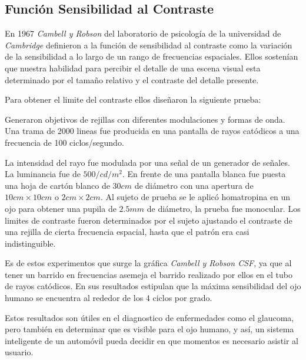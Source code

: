 \documentclass[conference]{IEEEtran}
\begin{document}
\subsection{Función Sensibilidad al Contraste}

En 1967 \textit{Cambell y Robson} del laboratorio de psicología  de la universidad de \textit{Cambridge}\cite{p5} definieron a la función de sensibilidad al contraste como la variación de la sensibilidad a lo largo de un rango de frecuencias espaciales. Ellos sostenían que nuestra habilidad para percibir el detalle de una escena visual esta determinado por el tamaño relativo y el contraste del detalle presente.

Para obtener el limite del contraste ellos diseñaron la siguiente prueba: 

Generaron objetivos de rejillas con diferentes modulaciones y formas de onda. Una  trama de 2000 lineas
fue producida en una pantalla de rayos catódicos a una frecuencia de 100 ciclos/segundo.

La intensidad del rayo fue modulada por una señal de un generador de señales. La luminancia fue de
$500/cd/m^2$. En 
frente de una pantalla blanca fue puesta una hoja de cartón blanco de $30cm$ de diámetro con una apertura de $10cm \times 10cm$ o $2cm \times 2cm$. Al sujeto de prueba se le aplicó homatropina en un ojo para obtener una pupila de $2.5 mm$ de diámetro, la prueba fue monocular. Los limites de contraste fueron determinados por el sujeto ajustando el contraste de una rejilla de cierta frecuencia espacial, hasta que el patrón era casi indistinguible.

Es de estos experimentos que surge la gráfica \textit{Cambell y Robson CSF}, ya que al tener un barrido en frecuencias  asemeja el barrido realizado por ellos en el tubo de rayos catódicos. En sus resultados estipulan que la máxima sensibilidad del ojo humano se encuentra al rededor de los 4 ciclos por grado.

Estos resultados son útiles en el diagnostico de enfermedades como el glaucoma\cite{p6}, pero también
en determinar que es visible para el ojo humano, y así, un sistema inteligente de un automóvil pueda decidir en que momentos es necesario asistir al usuario. 



\end{document}

